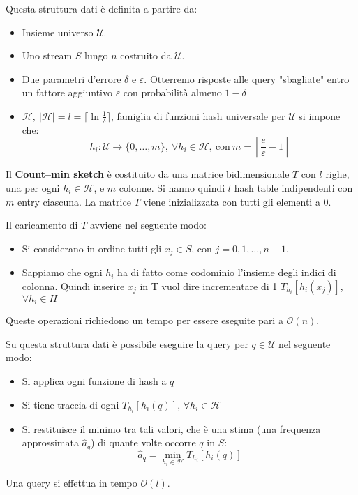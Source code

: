 Questa struttura dati è definita a partire da:
\begin{itemize}
    \item Insieme universo $\mathcal{U}$.
    \item Uno stream $S$ lungo $n$ costruito da $\mathcal{U}$.
    \item Due parametri d'errore $\delta$ e $\varepsilon$. Otterremo risposte alle query "sbagliate" entro un fattore aggiuntivo $\varepsilon$ con probabilità almeno $1 - \delta$
    \item $\mathcal{H}, \ |\mathcal{H}| = l = \lceil \ln \frac{1}{\delta} \rceil$, famiglia di funzioni hash universale per $\mathcal{U}$ si impone che:
    \begin{equation}
        h_i: \mathcal{U} \to \{0, \dots, m\}, \ \forall h_i \in \mathcal{H}, \ \text{con} \ m = \left\lceil \frac{e}{\varepsilon} - 1 \right\rceil
    \end{equation}
\end{itemize}

Il \textbf{Count–min sketch} è costituito da una matrice bidimensionale $T$ con $l$ righe, una per ogni $h_i \in \mathcal{H}$, e $m$ colonne. Si hanno quindi $l$ hash table indipendenti con $m$ entry ciascuna. La matrice $T$ viene inizializzata con tutti gli elementi a $0$.

Il caricamento di $T$ avviene nel seguente modo:
\begin{itemize}
    \item Si considerano in ordine tutti gli $x_j \in S$, con $j = 0, 1, \dots, n - 1$.
    \item Sappiamo che ogni $h_i$ ha di fatto come codominio l'insieme degli indici di colonna. Quindi inserire $x_j$ in T vuol dire incrementare di 1 $T_{h_i} [h_i(x_j)]$, $\forall h_i \in H$
\end{itemize}
Queste operazioni richiedono un tempo per essere eseguite pari a $\mathcal{O}(n)$.

Su questa struttura dati è possibile eseguire la query per $q \in \mathcal{U}$ nel seguente modo:
\begin{itemize}
    \item Si applica ogni funzione di hash a $q$
    \item Si tiene traccia di ogni $T_{h_i} [h_i(q)]$, $\forall h_i \in \mathcal{H}$
    \item Si restituisce il minimo tra tali valori, che è una stima (una frequenza approssimata $\hat{a}_q$) di quante volte occorre $q$ in $S$:
    \begin{equation}
        \hat{a}_q = \min_{h_i \in \mathcal{H}} T_{h_i} [h_i(q)]
    \end{equation}
\end{itemize}
Una query si effettua in tempo $\mathcal{O}(l)$.

